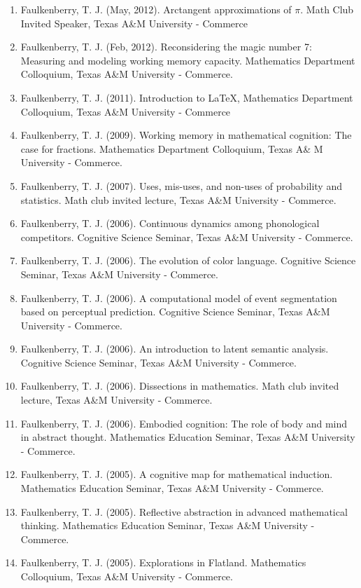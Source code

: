 \documentclass[article,10pt]{article}
\begin{document}
\begin{enumerate}
\item Faulkenberry, T. J. (May, 2012). Arctangent approximations of \(\pi\). Math Club Invited Speaker, Texas A\&M University - Commerce
\item Faulkenberry, T. J. (Feb, 2012). Reconsidering the magic number 7: Measuring and modeling working memory capacity. Mathematics Department Colloquium, Texas A\&M University - Commerce.
\item Faulkenberry, T. J. (2011). Introduction to \LaTeX{}, Mathematics Department Colloquium, Texas A\&M University - Commerce
\item Faulkenberry, T. J. (2009). Working memory in mathematical cognition: The case for fractions. Mathematics Department Colloquium, Texas A\& M University - Commerce.
\item Faulkenberry, T. J. (2007). Uses, mis-uses, and non-uses of probability and statistics. Math club invited lecture, Texas A\&M University - Commerce.
\item Faulkenberry, T. J. (2006). Continuous dynamics among phonological competitors. Cognitive Science Seminar, Texas A\&M University - Commerce.
\item Faulkenberry, T. J. (2006). The evolution of color language. Cognitive Science Seminar, Texas A\&M University - Commerce.
\item Faulkenberry, T. J. (2006). A computational model of event segmentation based on perceptual prediction. Cognitive Science Seminar, Texas A\&M University - Commerce.
\item Faulkenberry, T. J. (2006). An introduction to latent semantic analysis. Cognitive Science Seminar, Texas A\&M University - Commerce.
\item Faulkenberry, T. J. (2006). Dissections in mathematics. Math club invited lecture, Texas A\&M University - Commerce.
\item Faulkenberry, T. J. (2006). Embodied cognition: The role of body and mind in abstract thought. Mathematics Education Seminar, Texas A\&M University - Commerce.
\item Faulkenberry, T. J. (2005). A cognitive map for mathematical induction. Mathematics Education Seminar, Texas A\&M University - Commerce.
\item Faulkenberry, T. J. (2005). Reflective abstraction in advanced mathematical thinking. Mathematics Education Seminar, Texas A\&M University - Commerce.
\item Faulkenberry, T. J. (2005). Explorations in Flatland. Mathematics Colloquium, Texas A\&M University - Commerce.

\end{enumerate}
\end{document}
